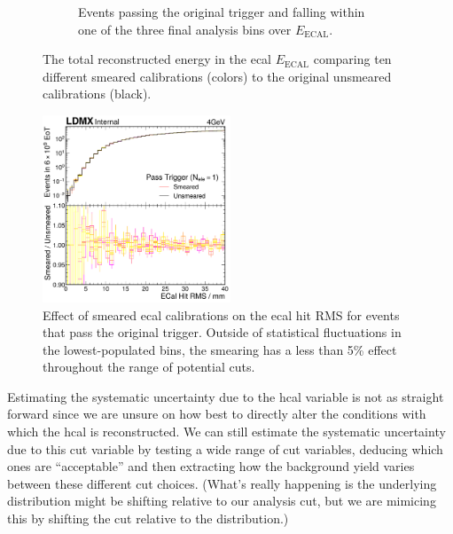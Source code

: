 \begin{figure}
\begin{subfigure}[t]{0.49\textwidth}
    \caption{Events passing the original trigger and falling within one of the three
    final analysis bins over $E_\text{ECAL}$.}
    \label{fig:4gev-smeared-unsmeared-comp:pass-trigger}
  \end{subfigure}
  \caption{The total reconstructed energy in the \ac{ecal} $E_\text{ECAL}$ comparing 
  ten different smeared calibrations (colors) to the original unsmeared calibrations
  (black).}
  \label{fig:4gev-smeared-unsmeared-comp}
\end{figure}

\begin{figure}
  \centering
  \includegraphics[width=0.5\textwidth]{figures/ldmx/analysis/systematics/4gev-pass-trigger-uncorrcell-ecal-hit-rms.pdf}
  \caption{Effect of smeared \ac{ecal} calibrations on the \ac{ecal} hit RMS for events
  that pass the original trigger.
  Outside of statistical fluctuations in the lowest-populated bins, the smearing has
  a less than 5\% effect throughout the range of potential cuts.}
  \label{fig:4gev-smeared-unsmeared-ecal-hit-rms}
\end{figure}

Estimating the systematic uncertainty due to the \ac{hcal} variable is not as
straight forward since we are unsure on how best to directly alter the conditions
with which the \ac{hcal} is reconstructed.
We can still estimate the systematic uncertainty due to this cut variable
by testing a wide range of cut variables, deducing which ones
are ``acceptable'' and then extracting how the background yield varies between these
different cut choices.
(What's really happening is the underlying distribution might be shifting relative
to our analysis cut, but we are mimicing this by shifting the cut relative to the
distribution.)

